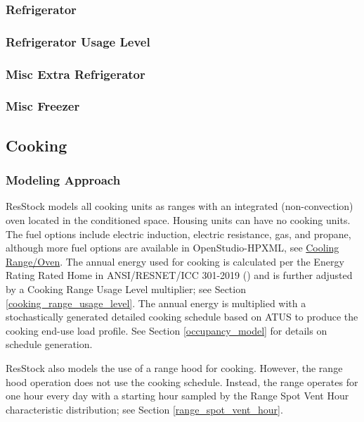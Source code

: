 \subsubsection{Refrigerator}


\subsubsection{Refrigerator Usage Level}


\subsubsection{Misc Extra Refrigerator}


\subsubsection{Misc Freezer}


\subsection{Cooking}
\subsubsection{Modeling Approach}
ResStock models all cooking units as ranges with an integrated (non-convection) oven located in the conditioned space. Housing units can have no cooking units. The fuel options include electric induction, electric resistance, gas, and propane, although more fuel options are available in OpenStudio-HPXML, see \href{https://openstudio-hpxml.readthedocs.io/en/v1.10.0/workflow_inputs.html#hpxml-cooking-range-oven}{Cooling Range/Oven}. The annual energy used for cooking is calculated per the Energy Rating Rated Home in ANSI/RESNET/ICC 301-2019 (\cite{ansi_resnet_301_2019}) and is further adjusted by a Cooking Range Usage Level multiplier; see Section \ref{cooking_range_usage_level}. The annual energy is multiplied with a stochastically generated detailed cooking schedule based on ATUS to produce the cooking end-use load profile. See Section \ref{occupancy_model} for details on schedule generation.

ResStock also models the use of a range hood for cooking. However, the range hood operation does not use the cooking schedule. Instead, the range operates for one hour every day with a starting hour sampled by the Range Spot Vent Hour characteristic distribution; see Section \ref{range_spot_vent_hour}.

